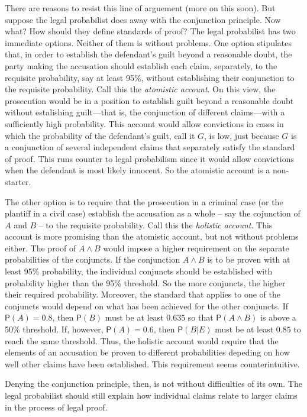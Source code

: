\documentclass[10pt,dvipsnames,enabledeprecatedfontcommands]{scrartcl}
\newcommand{\et}{\wedge}
\newcommand{\pr}[1]{\mathsf{P}(#1)}
\begin{document}
There are reasons to resist this line of arguement (more on this soon).
But suppose the legal probabilist does away with the conjunction
principle. Now what? How should they define standards of proof? The
legal probabilist has two immediate options. Neither of them is without
problems. One option stipulates that, in order to establish the
defendant's guilt beyond a reasonable doubt, the party making the
accusation should establish each claim, separately, to the requisite
probability, say at least 95\%, without establishing their conjunction
to the requisite probability. Call this the \textit{atomistic account}.
On this view, the prosecution would be in a position to establish guilt
beyond a reasonable doubt without estalishing guilt---that is, the
conjunction of different claims---with a sufficiently high probability.
This account would allow convictions in cases in which the probability
of the defendant's guilt, call it \(G\), is low, just because \(G\) is a
conjunction of several independent claims that separately satisfy the
standard of proof. This runs counter to legal probabilism since it would
allow convictions when the defendant is most likely innocent. So the
atomistic account is a non-starter.

The other option is to require that the prosecution in a criminal case
(or the plantiff in a civil case) establish the accusation as a whole --
say the cojunction of \(A\) and \(B\) -- to the requisite probability.
Call this the \textit{holistic account}. This account is more promising
than the atomistic account, but not without problems either. The proof
of \(A\et B\) would impose a higher requirement on the separate
probabilities of the conjuncts. If the conjunction \(A\et B\) is to be
proven with at least 95\% probability, the individual conjuncts should
be established with probability higher than the 95\% threshold. So the
more conjuncts, the higher their required probability. Moreover, the
standard that applies to one of the conjuncts would depend on what has
been achieved for the other conjuncts. If \(\pr{A}=0.8\), then
\(\pr{B}\) must be at least \(0.635\) so that \(\pr{A\et B}\) is above a
50\% threshold. If, however, \(\pr{A}=0.6\), then \(\pr{B\vert E}\) must
be at least \(0.85\) to reach the same threshold. Thus, the holistic
account would require that the elements of an accusation be proven to
different probabilities depeding on how well other claims have been
established. This requirement seems counterintuitive.

Denying the conjunction principle, then, is not without difficulties of
its own. The legal probabilist should still explain how individual
claims relate to larger claims in the process of legal proof.
\end{document}
